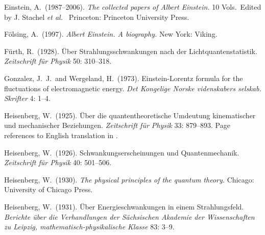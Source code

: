 \documentclass{elsart}
\begin{document}
{\begin{thebibliography}{}

 Einstein, A.\ (1987--2006). {\it The collected papers of Albert Einstein.} 10 Vols.\ Edited by J. Stachel {\it et al.\ } Princeton: Princeton University Press.

 F\"olsing, A.\ (1997). {\it Albert Einstein. A biography.} New York: Viking.

 F\"urth, R.\ (1928). \"Uber Strahlungsschwankungen nach der Lichtquantenstatistik.  {\it Zeitschrift f\"{u}r Physik} 50: 310--318.


 Gonzalez, J.\ J.\  and Wergeland, H.\  (1973). Einstein-Lorentz formula for the fluctuations of electromagnetic energy. {\it Det Kongelige Norske videnskabers selskab. Skrifter} 4: 1--4.


 Heisenberg, W.\ (1925). \"{U}ber die quantentheoretische Umdeutung kinematischer und mechanischer Beziehungen. {\it Zeitschrift f\"{u}r Physik} 33: 879--893. Page references to English translation in \citep[pp.\ 261--276]{Van der Waerden}.


 Heisenberg, W.\ (1926). Schwankungserscheinungen und Quantenmechanik. {\it Zeitschrift f\"{u}r Physik} 40: 501--506. 

 Heisenberg, W.\ (1930). {\it The physical principles of the quantum theory.} Chicago: University of Chicago Press.


 Heisenberg, W.\ (1931). \"Uber Energieschwankungen in einem Strahlungsfeld. {\it Berichte \"uber die Verhandlungen der 
S\"achsischen Akademie der Wissenschaften zu Leipzig, mathematisch-physikalische Klasse} 83: 3--9. %


\end{thebibliography}}
\end{document}

